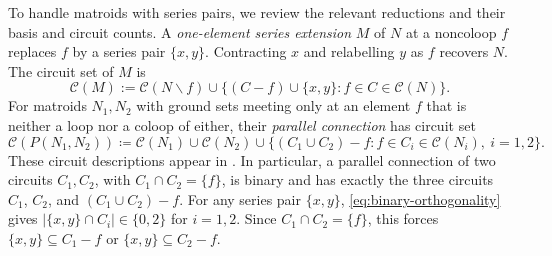 \documentclass[11pt]{article}
\numberwithin{equation}{section}
\newcommand{\CC}{\mathcal C}
\begin{document}
To handle matroids with series pairs, we review the relevant
reductions and their basis and circuit counts.
A \emph{one-element series extension} \(M\) of \(N\) at a noncoloop
\(f\) replaces \(f\) by a series pair \(\{x,y\}\). Contracting \(x\)
and relabelling \(y\) as \(f\) recovers \(N\). The circuit set of \(M\) is
\begin{equation}\label{eq:series-circuits}
 \CC(M):=\CC(N\backslash f)\cup
 \{(C-f)\cup\{x,y\}:f\in C\in\CC(N)\}.
\end{equation}
For matroids \(N_1,N_2\) with ground sets meeting only at an
element \(f\) that is neither a loop nor a coloop of either,
their \emph{parallel connection} has circuit set
\begin{equation}\label{eq:parallel-circuits}
 \CC(P(N_1,N_2))\coloneqq\CC(N_1)\cup\CC(N_2)\cup
 \{(C_1\cup C_2)-f:f\in C_i\in\CC(N_i),\ i=1,2\}.
\end{equation}
These circuit descriptions appear in \cite[Section~7.1]{Oxley2011}.
In particular, a parallel connection of two circuits \(C_1,C_2\),
with \(C_1\cap C_2=\{f\}\), is binary
\cite[Proposition~7.1.24]{Oxley2011} and has exactly the three circuits
\(C_1\), \(C_2\), and \((C_1\cup C_2)-f\).
For any series pair \(\{x,y\}\), \eqref{eq:binary-orthogonality} gives
\(|\{x,y\}\cap C_i|\in\{0,2\}\) for \(i=1,2\).
Since \(C_1\cap C_2=\{f\}\), this forces
\(\{x,y\}\subseteq C_1-f\) or \(\{x,y\}\subseteq C_2-f\).
\end{document}
